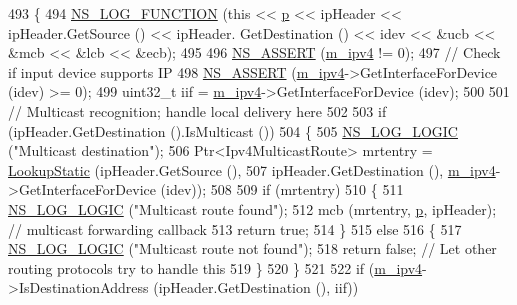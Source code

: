 \begin{DoxyCode}
493 \{
494   \hyperlink{log-macros-disabled_8h_a90b90d5bad1f39cb1b64923ea94c0761}{NS\_LOG\_FUNCTION} (\textcolor{keyword}{this} << \hyperlink{lte__link__budget_8m_ac9de518908a968428863f829398a4e62}{p} << ipHeader << ipHeader.GetSource () << ipHeader.
      GetDestination () << idev << &ucb << &mcb << &lcb << &ecb);
495 
496   \hyperlink{assert_8h_a6dccdb0de9b252f60088ce281c49d052}{NS\_ASSERT} (\hyperlink{classns3_1_1Ipv4StaticRouting_adc30356be1824ea40ffbd444a5d91b9f}{m\_ipv4} != 0);
497   \textcolor{comment}{// Check if input device supports IP }
498   \hyperlink{assert_8h_a6dccdb0de9b252f60088ce281c49d052}{NS\_ASSERT} (\hyperlink{classns3_1_1Ipv4StaticRouting_adc30356be1824ea40ffbd444a5d91b9f}{m\_ipv4}->GetInterfaceForDevice (idev) >= 0);
499   uint32\_t iif = \hyperlink{classns3_1_1Ipv4StaticRouting_adc30356be1824ea40ffbd444a5d91b9f}{m\_ipv4}->GetInterfaceForDevice (idev); 
500 
501   \textcolor{comment}{// Multicast recognition; handle local delivery here}
502 
503   \textcolor{keywordflow}{if} (ipHeader.GetDestination ().IsMulticast ())
504     \{
505       \hyperlink{group__logging_ga88acd260151caf2db9c0fc84997f45ce}{NS\_LOG\_LOGIC} (\textcolor{stringliteral}{"Multicast destination"});
506       Ptr<Ipv4MulticastRoute> mrtentry =  \hyperlink{classns3_1_1Ipv4StaticRouting_a9ee2a4c5597e9b238369ba3667121852}{LookupStatic} (ipHeader.GetSource (),
507                                                         ipHeader.GetDestination (), 
      \hyperlink{classns3_1_1Ipv4StaticRouting_adc30356be1824ea40ffbd444a5d91b9f}{m\_ipv4}->GetInterfaceForDevice (idev));
508 
509       \textcolor{keywordflow}{if} (mrtentry)
510         \{
511           \hyperlink{group__logging_ga88acd260151caf2db9c0fc84997f45ce}{NS\_LOG\_LOGIC} (\textcolor{stringliteral}{"Multicast route found"});
512           mcb (mrtentry, \hyperlink{lte__link__budget_8m_ac9de518908a968428863f829398a4e62}{p}, ipHeader); \textcolor{comment}{// multicast forwarding callback}
513           \textcolor{keywordflow}{return} \textcolor{keyword}{true};
514         \}
515       \textcolor{keywordflow}{else}
516         \{
517           \hyperlink{group__logging_ga88acd260151caf2db9c0fc84997f45ce}{NS\_LOG\_LOGIC} (\textcolor{stringliteral}{"Multicast route not found"});
518           \textcolor{keywordflow}{return} \textcolor{keyword}{false}; \textcolor{comment}{// Let other routing protocols try to handle this}
519         \}
520     \}
521 
522   \textcolor{keywordflow}{if} (\hyperlink{classns3_1_1Ipv4StaticRouting_adc30356be1824ea40ffbd444a5d91b9f}{m\_ipv4}->IsDestinationAddress (ipHeader.GetDestination (), iif))

\end{DoxyCode}
